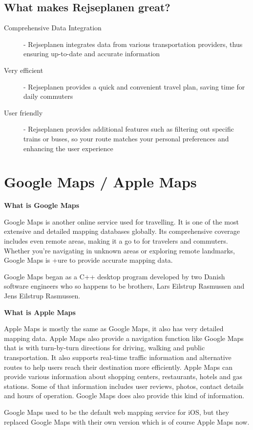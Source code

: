 \documentclass[11pt]{article}
\begin{document}
    \subsection{What makes Rejseplanen great?}\label{subsec:what-makes-rejseplanen-great?}
    \begin{description}
        \item [Comprehensive Data Integration] - Rejseplanen integrates data from various transportation providers, thus ensuring up-to-date and accurate information
        \item [Very efficient] - Rejseplanen provides a quick and convenient travel plan, saving time for daily commuters
        \item [User friendly] - Rejseplanen provides additional features such as filtering out specific trains or buses, so your route matches your personal preferences and enhancing the user experience
    \end{description}


    \section{Google Maps / Apple Maps}\label{sec:google-maps-/-apple-maps}

    \textbf{What is Google Maps}

    Google Maps is another online service used for travelling.
    It is one of the most extensive and detailed mapping databases globally.
    Its comprehensive coverage includes even remote areas, making it a go to for travelers and commuters.
    Whether you're navigating in unknown areas or exploring remote landmarks, Google Maps is +ure to provide accurate
    mapping data.\cite{GoogleMaps} \newline

    Google Maps began as a C++ desktop program developed by two Danish software engineers who so happens to be brothers,
    Lars Eilstrup Rasmussen and Jens Eilstrup Rasmussen.\cite{GoogleMaps} \newline

    \textbf{What is Apple Maps}

    Apple Maps is mostly the same as Google Maps, it also has very detailed mapping data.
    Apple Maps also provide a navigation function like Google Maps that is with turn-by-turn directions for driving,
    walking and public transportation.
    It also supports real-time traffic information and alternative routes to help users reach their destination more
    efficiently.
    Apple Maps can provide various information about shopping centers, restaurants, hotels and gas stations.
    Some of that information includes user reviews, photos, contact details and hours of operation.
    Google Maps does also provide this kind of information. \newline

    Google Maps used to be the default web mapping service for iOS, but they replaced Google Maps with their own version
    which is of course Apple Maps now. \cite{AppleMapsWiki} \newline

    
    
\end{document}

